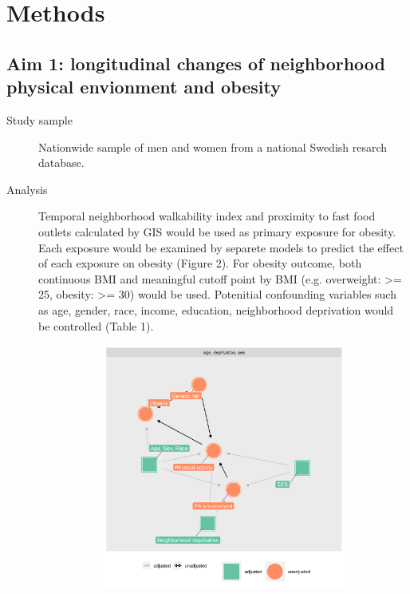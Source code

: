 \documentclass[12]{article}
\begin{document}
\newpage

\section{Methods}
\subsection{Aim 1: longitudinal changes of neighborhood physical envionment and obesity}
  \begin{description}
    \item[Study sample] Nationwide sample of men and women from a national Swedish resarch database.
    \item[Analysis] Temporal neighborhood walkability index and proximity to fast food outlets calculated by GIS would be used as primary exposure for obesity. Each exposure would be examined by separete models to predict the effect of each exposure on obesity (Figure 2). For obesity outcome, both continuous BMI and meaningful cutoff point by BMI (e.g. overweight: >= 25, obesity: >= 30) would be used. Potenitial confounding variables such as age, gender, race, income, education, neighborhood deprivation would be controlled (Table 1).  
\begin{figure}[h!]
  \centering
  \begin{subfigure}[b]{0.4\linewidth}
    \includegraphics[width=\linewidth]{graph/dag2.png}

\end{subfigure}
\end{figure}
\end{description}
\end{document}
